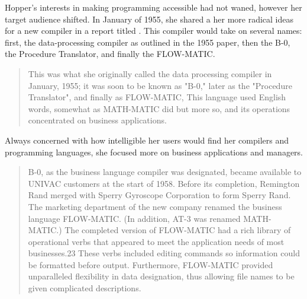 Hopper's interests in making programming accessible had not waned,
however her target audience shifted.
In January of 1955, she shared a her more radical ideas for a new
compiler in a report titled
\cite{hopper_1955_preliminary_definitions_data_processing_compiler}
.
This compiler would take on several names: first, the data-processing
compiler as outlined in the 1955 paper, then the B-0, the Procedure Translator,
and finally the FLOW-MATIC.

\begin{quotation}
  This was what she originally called the data processing compiler in January,
  1955; it was soon to be known as "B-0," later as the "Procedure
  Translator", and finally as FLOW-MATIC, This language used English
  words, somewhat as MATH-MATIC did but more so, and its operations concentrated
  on business applications.
  \cite{history_of_computing_in_the_twentieth_century_1980}
\end{quotation}

Always concerned with how intelligible her users would find her compilers
and programming languages, she focused more on business applications and managers.



\begin{quotation}
  B-0, as the business language compiler was designated, became available to
  UNIVAC customers at the start of 1958. Before its completion, Remington Rand
  merged with Sperry Gyroscope Corporation to form Sperry Rand. The marketing
  department of the new company renamed the business language FLOW-MATIC. (In
  addition, AT-3 was renamed MATH-MATIC.) The completed version of
  FLOW-MATIC had
  a rich library of operational verbs that appeared to meet the application
  needs of most businesses.23 These verbs included editing commands so
  information could be formatted before output. Furthermore, FLOW-MATIC provided
  unparalleled flexibility in data designation, thus allowing file names to be
  given complicated descriptions.
\end{quotation}

